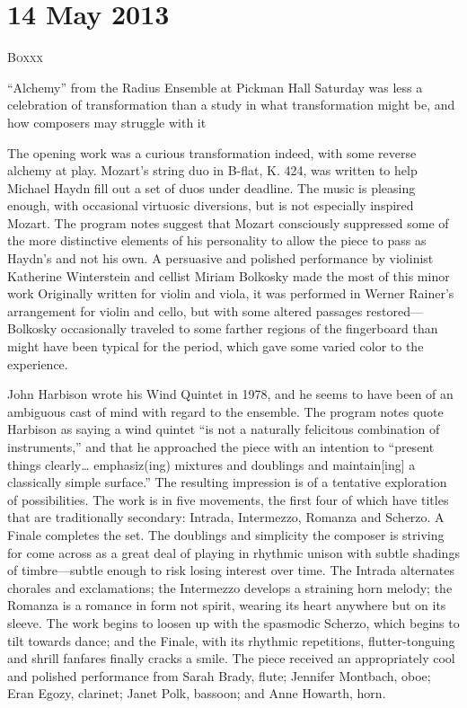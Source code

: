 \chapter{14 May 2013}

\textsc{Boxxx}

“Alchemy” from the Radius Ensemble at Pickman Hall Saturday was less a celebration of transformation than a study in what transformation might be, and how composers may struggle with it

The opening work was a curious transformation indeed, with some reverse alchemy at play. Mozart’s string duo in B-flat, K. 424, was written to help Michael Haydn fill out a set of duos under deadline. The music is pleasing enough, with occasional virtuosic diversions, but is not especially inspired Mozart. The program notes suggest that Mozart consciously suppressed some of the more distinctive elements of his personality to allow the piece to pass as Haydn’s and not his own. A persuasive and polished performance by violinist Katherine Winterstein and cellist Miriam Bolkosky made the most of this minor work Originally written for violin and viola, it was performed in Werner Rainer’s arrangement for violin and cello, but with some altered passages restored—Bolkosky occasionally traveled to some farther regions of the fingerboard than might have been typical for the period, which gave some varied color to the experience.

John Harbison wrote his Wind Quintet in 1978, and he seems to have been of an ambiguous cast of mind with regard to the ensemble. The program notes quote Harbison as saying a wind quintet “is not a naturally felicitous combination of instruments,” and that he approached the piece with an intention to “present things clearly… emphasiz(ing) mixtures and doublings and maintain[ing] a classically simple surface.” The resulting impression is of a tentative exploration of possibilities. The work is in five movements, the first four of which have titles that are traditionally secondary: Intrada, Intermezzo, Romanza and Scherzo. A Finale completes the set. The doublings and simplicity the composer is striving for come across as a great deal of playing in rhythmic unison with subtle shadings of timbre—subtle enough to risk losing interest over time. The Intrada alternates chorales and exclamations; the Intermezzo develops a straining horn melody; the Romanza is a romance in form not spirit, wearing its heart anywhere but on its sleeve. The work begins to loosen up with the spasmodic Scherzo, which begins to tilt towards dance; and the Finale, with its rhythmic repetitions, flutter-tonguing and shrill fanfares finally cracks a smile. The piece received an appropriately cool and polished performance from Sarah Brady, flute; Jennifer Montbach, oboe; Eran Egozy, clarinet; Janet Polk, bassoon; and Anne Howarth, horn.

